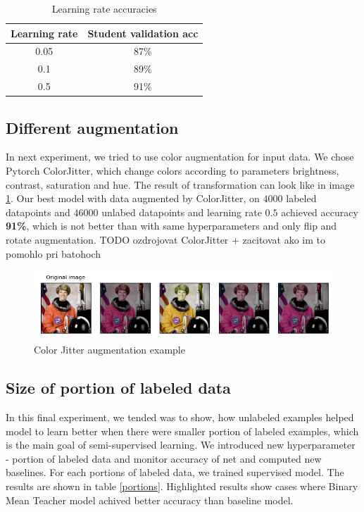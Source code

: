 \begin{table}[h]
    \centering
    \begin{tabular}{ |c|c|} 
     \hline

     Learning rate & Student validation acc\\
     \hline
     0.05 & 87\% \\
     0.1 &  89\% \\
     0.5 & 91\% \\
     \hline
    \end{tabular}
    \caption{Learning rate accuracies}
    \label{bmt:lr}
\end{table}

\subsection{Different augmentation}
In next experiment, we tried to use color augmentation for input data. We chose Pytorch ColorJitter, which change colors according to parameters brightness, contrast, saturation and hue. The result of transformation can look like in image \ref{jitter}.
Our best model with data augmented by ColorJitter, on $4000$ labeled datapoints and $46000$ unlabed datapoints and learning rate $0.5$ achieved accuracy \textbf{91\%}, which is not better than with same hyperparameters and only flip and rotate augmentation.
\color{red}  TODO ozdrojovat ColorJitter + zacitovat ako im to pomohlo pri batohoch
\color{black}
\begin{figure}[!h]
    \centering
    \includegraphics[width=1\textwidth]{figs/jitter.png}
    \caption{Color Jitter augmentation example \cite{colorjitter}}
    \label{jitter}
\end{figure}


\subsection{Size of portion of labeled data}

In this final experiment, we tended was to show, how unlabeled examples helped model to learn better when there were  smaller portion of labeled examples, which is the main goal of semi-supervised learning. We introduced new hyperparameter - portion of labeled data and monitor accuracy of net and computed new baselines. For each portions of labeled data, we trained supervised model. The results are shown in table \ref{portions}. Highlighted results show cases where Binary Mean Teacher model achived better accuracy than baseline model.

